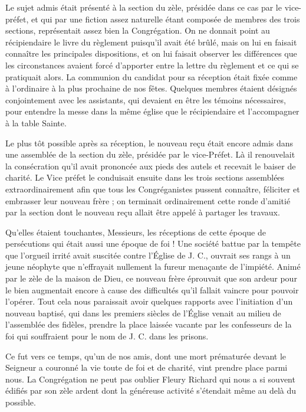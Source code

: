 Le sujet admis était présenté à la section du zèle, présidée dans ce cas par le vice-préfet, et qui par une fiction assez naturelle étant composée de membres des trois sections, représentait assez bien la Congrégation. On ne donnait point au récipiendaire le livre du règlement puisqu'il avait été brûlé, mais on lui en faisait connaître les principales dispositions, et on lui faisait observer les différences que les circonstances avaient forcé d'apporter entre la lettre du règlement et ce qui se pratiquait alors. La communion du candidat pour sa réception était fixée comme à l'ordinaire à la plus prochaine de nos fêtes. Quelques membres étaient désignés conjointement avec les assistants, qui devaient en être les témoins nécessaires, pour entendre la messe dans la même église que le récipiendaire et l'accompagner à la table Sainte.

Le plus tôt possible après sa réception, le nouveau reçu était encore admis dans une assemblée de la section du zèle, présidée par le vice-Préfet. Là il renouvelait la consécration qu'il avait prononcée
aux pieds des autels et recevait le baiser de charité. Le Vice préfet le conduisait ensuite dans les trois sections assemblées extraordinairement afin que tous les Congréganistes pussent connaître, féliciter et embrasser leur nouveau frère ; on terminait ordinairement cette ronde d'amitié par la section dont le nouveau reçu allait être appelé à partager les travaux.

Qu'elles étaient touchantes, Messieurs, les réceptions de cette époque de persécutions qui était aussi une époque de foi ! Une société battue par la tempête que l'orgueil irrité avait suscitée contre l'Église de J. C., ouvrait ses rangs à un jeune néophyte que n'effrayait nullement la fureur menaçante de l'impiété. Animé par le zèle de la maison de Dieu, ce nouveau frère éprouvait que son ardeur pour le bien augmentait encore à cause des difficultés qu'il fallait vaincre pour pouvoir l'opérer. Tout cela nous paraissait avoir quelques rapports avec l'initiation d'un nouveau baptisé, qui dans les premiers siècles de l'Église venait au milieu de l'assemblée des fidèles, prendre la place laissée vacante par les confesseurs de la foi qui souffraient pour le nom de J. C. dans les prisons.

Ce fut vers ce temps, qu'un de nos amis, dont une mort prématurée devant le Seigneur a couronné la vie toute de foi et de charité, vint prendre place parmi nous. La Congrégation ne peut pas oublier Fleury Richard qui nous a si souvent édifiés par son zèle ardent dont la généreuse activité s'étendait même au delà du possible.

